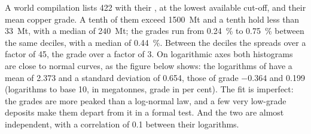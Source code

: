 A world compilation lists 422  with their , at the lowest available
cut-off, and their mean copper grade. A tenth of them exceed \qty{1500}{Mt} and a tenth hold less
than \qty{33}{Mt}, with a median of \qty{240}{Mt}; the grades run from \qty{0.24}{\percent} to
\qty{0.75}{\percent} between the same deciles, with a median of \qty{0.44}{\percent}. Between the
deciles the  spreads over a factor of 45, the grade over a factor of 3. On logarithmic axes both histograms are close to normal curves, as the figure below shows:
the logarithms of  have a mean of 2.373 and a standard deviation of 0.654, those of grade
$-0.364$ and 0.199 (logarithms to base 10,  in megatonnes, grade in per cent). The fit is
imperfect: the grades are more peaked than a log-normal law, and a few very low-grade deposits make
them depart from it in a formal test. And the two are almost independent, with a correlation of
0.1 between their logarithms.


